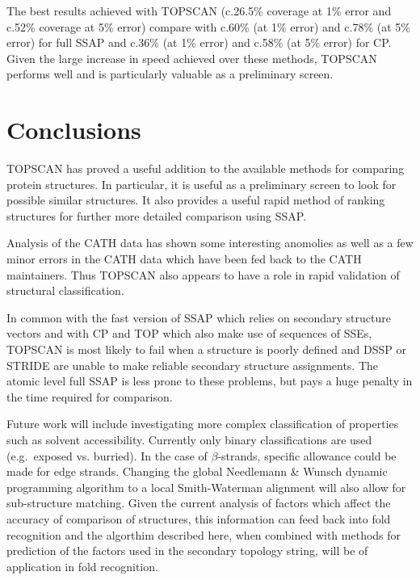 \documentclass{article}
\begin{document}
The best results achieved with TOPSCAN (c.26.5\% coverage at 1\% error
and c.52\% coverage at 5\% error) compare with c.60\% (at 1\% error)
and c.78\% (at 5\% error) for full SSAP and c.36\% (at 1\% error) and
c.58\% (at 5\% error) for CP\cite{gilbert:aisb}. Given the large
increase in speed achieved over these methods, TOPSCAN performs well
and is particularly valuable as a preliminary screen.

\section{Conclusions}
TOPSCAN has proved a useful addition to the available methods for
comparing protein structures. In particular, it is useful as a
preliminary screen to look for possible similar structures. It also
provides a useful rapid method of ranking structures for further more
detailed comparison using SSAP.

Analysis of the CATH data has shown some interesting anomolies as well
as a few minor errors in the CATH data which have been fed back to the
CATH maintainers. Thus TOPSCAN also appears to have a role in rapid
validation of structural classification.

In common with the fast version of SSAP which relies on secondary
structure vectors and with CP and TOP which also make use of sequences
of SSEs, TOPSCAN is most likely to fail when a structure is poorly
defined and DSSP or STRIDE are unable to make reliable secondary
structure assignments. The atomic level full SSAP is less prone to
these problems, but pays a huge penalty in the time required for
comparison.

Future work will include investigating more complex classification of
properties such as solvent accessibility. Currently only binary
classifications are used (e.g.\ exposed vs. burried). In the case of
$\beta$-strands, specific allowance could be made for edge
strands. Changing the global Needlemann \& Wunsch dynamic programming
algorithm to a local Smith-Waterman alignment will also allow for
sub-structure matching. Given the current analysis of factors which
affect the accuracy of comparison of structures, this information can
feed back into fold recognition and the algorthim described here, when
combined with methods for prediction of the factors used in the
secondary topology string, will be of application in fold recognition.

\end{document}
